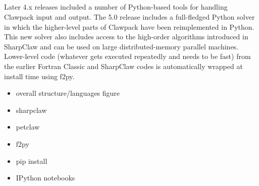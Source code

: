 %
%
%

\subsection{\pyclaw}

Later 4.x releases included a number of Python-based tools for handling Clawpack input and output.  The 5.0 release includes a full-fledged Python solver in which the higher-level parts of Clawpack have been reimplemented in Python.  This new solver also includes access to the high-order algorithms introduced in SharpClaw and can be used on large distributed-memory parallel machines.  Lower-level code (whatever gets executed repeatedly and needs to be fast) from the earlier Fortran Classic and SharpClaw codes is automatically wrapped at install time using f2py.

\begin{itemize}
    \item overall structure/languages figure
    \item sharpclaw
    \item petclaw
    \item f2py
    \item pip install
    \item IPython notebooks
\end{itemize}